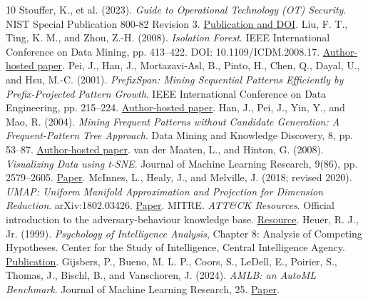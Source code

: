 \documentclass[11pt,a4paper]{article}
\begin{document}
\begingroup
\small
\renewcommand{\section}[2]{}
\begin{thebibliography}{10}
 Stouffer, K., et al. (2023). \emph{Guide to Operational Technology (OT) Security}. NIST Special Publication 800-82 Revision 3. \href{\detokenize{https://doi.org/10.6028/NIST.SP.800-82r3}}{Publication and DOI}.
 Liu, F. T., Ting, K. M., and Zhou, Z.-H. (2008). \emph{Isolation Forest}. IEEE International Conference on Data Mining, pp. 413--422. DOI: 10.1109/ICDM.2008.17. \href{\detokenize{https://cs.nju.edu.cn/zhouzh/zhouzh.files/publication/icdm08b.pdf}}{Author-hosted paper}.
 Pei, J., Han, J., Mortazavi-Asl, B., Pinto, H., Chen, Q., Dayal, U., and Hsu, M.-C. (2001). \emph{PrefixSpan: Mining Sequential Patterns Efficiently by Prefix-Projected Pattern Growth}. IEEE International Conference on Data Engineering, pp. 215--224. \href{\detokenize{https://www.cs.sfu.ca/~jpei/publications/span.pdf}}{Author-hosted paper}.
 Han, J., Pei, J., Yin, Y., and Mao, R. (2004). \emph{Mining Frequent Patterns without Candidate Generation: A Frequent-Pattern Tree Approach}. Data Mining and Knowledge Discovery, 8, pp. 53--87. \href{\detokenize{https://www.cs.sfu.ca/~jpei/publications/dami03_fpgrowth.pdf}}{Author-hosted paper}.
 van der Maaten, L., and Hinton, G. (2008). \emph{Visualizing Data using t-SNE}. Journal of Machine Learning Research, 9(86), pp. 2579--2605. \href{\detokenize{https://jmlr.org/papers/v9/vandermaaten08a.html}}{Paper}.
 McInnes, L., Healy, J., and Melville, J. (2018; revised 2020). \emph{UMAP: Uniform Manifold Approximation and Projection for Dimension Reduction}. arXiv:1802.03426. \href{\detokenize{https://arxiv.org/abs/1802.03426}}{Paper}.
 MITRE. \emph{ATT\&CK Resources}. Official introduction to the adversary-behaviour knowledge base. \href{\detokenize{https://attack.mitre.org/resources/}}{Resource}.
 Heuer, R. J., Jr. (1999). \emph{Psychology of Intelligence Analysis}, Chapter 8: Analysis of Competing Hypotheses. Center for the Study of Intelligence, Central Intelligence Agency. \href{\detokenize{https://www.cia.gov/resources/csi/static/Pyschology-of-Intelligence-Analysis.pdf}}{Publication}.
 Gijsbers, P., Bueno, M. L. P., Coors, S., LeDell, E., Poirier, S., Thomas, J., Bischl, B., and Vanschoren, J. (2024). \emph{AMLB: an AutoML Benchmark}. Journal of Machine Learning Research, 25. \href{\detokenize{https://jmlr.org/papers/v25/22-0493.html}}{Paper}.

\end{thebibliography}
\end{document}
